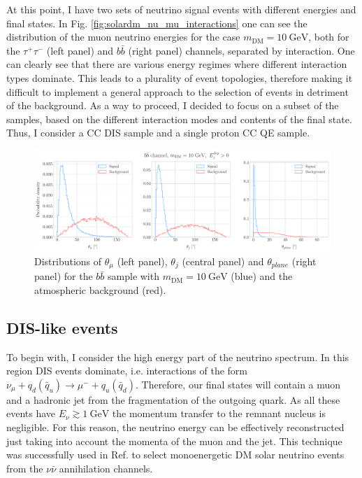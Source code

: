At this point, I have two sets of neutrino signal events with different energies and final states. In Fig. \ref{fig:solardm_nu_mu_interactions} one can see the distribution of the muon neutrino energies for the case $m_{\mathrm{DM}} = 10 \ \mathrm{GeV}$, both for the $\tau^{+} \tau^{-}$ (left panel) and $b\bar{b}$ (right panel) channels, separated by interaction. One can clearly see that there are various energy regimes where different interaction types dominate. This leads to a plurality of event topologies, therefore making it difficult to implement a general approach to the selection of events in detriment of the background. As a way to proceed, I decided to focus on a subset of the samples, based on the different interaction modes and contents of the final state. Thus, I consider a CC DIS sample and a single proton CC QE sample.

\begin{figure}[t]
	\centering
	\includegraphics[width=0.95\linewidth]{Images/DM_Analysis/solardm_bb_100_dis_angular_dists.pdf}
	\caption[Angular distributions for the $b\bar{b}$ DIS sample with $m_{\mathrm{DM}} = 10 \ \mathrm{GeV}$ and the atmospheric background.]{Distributions of $\theta_{\mu}$ (left panel), $\theta_{j}$ (central panel) and $\theta_{plane}$ (right panel) for the $b\bar{b}$ sample with $m_{\mathrm{DM}} = 10 \ \mathrm{GeV}$ (blue) and the atmospheric background (red).}
	\label{fig:solardm_bb_100_dis_angular_dists}
\end{figure}

\subsection{DIS-like events}

To begin with, I consider the high energy part of the neutrino spectrum. In this region DIS events dominate, i.e. interactions of the form $\nu_{\mu} + q_{d}(\bar{q}_{u}) \rightarrow \mu^{-} + q_{u}(\bar{q}_{d})$. Therefore, our final states will contain a muon and a hadronic jet from the fragmentation of the outgoing quark. As all these events have $E_{\nu} \gtrsim 1 \ \mathrm{GeV}$ the momentum transfer to the remnant nucleus is negligible. For this reason, the neutrino energy can be effectively reconstructed just taking into account the momenta of the muon and the jet. This technique was successfully used in Ref. \cite{Rott2019} to select monoenergetic DM solar neutrino events from the $\nu \bar{\nu}$ annihilation channels.

